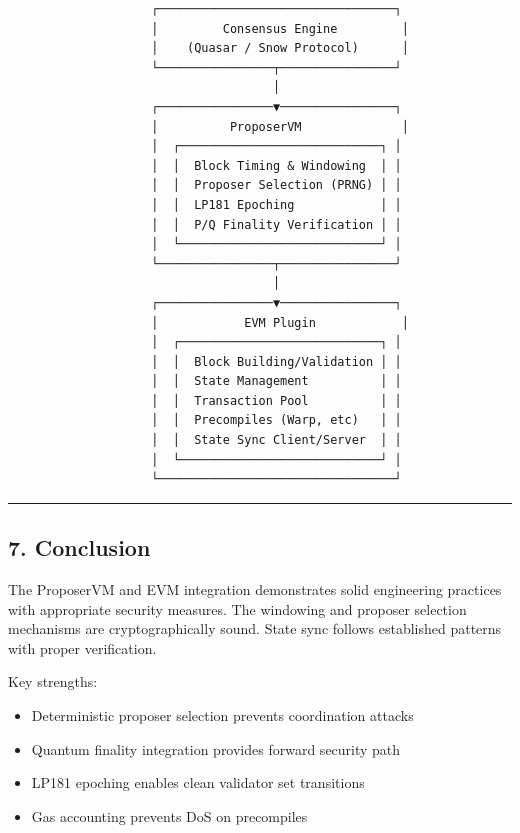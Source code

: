\documentclass[
]{article}
\providecommand{\tightlist}{%
  \setlength{\itemsep}{0pt}\setlength{\parskip}{0pt}}
\begin{document}
\begin{verbatim}
                    ┌─────────────────────────────────┐
                    │         Consensus Engine         │
                    │    (Quasar / Snow Protocol)      │
                    └────────────────┬────────────────┘
                                     │
                    ┌────────────────▼────────────────┐
                    │          ProposerVM              │
                    │  ┌────────────────────────────┐ │
                    │  │  Block Timing & Windowing  │ │
                    │  │  Proposer Selection (PRNG) │ │
                    │  │  LP181 Epoching            │ │
                    │  │  P/Q Finality Verification │ │
                    │  └────────────────────────────┘ │
                    └────────────────┬────────────────┘
                                     │
                    ┌────────────────▼────────────────┐
                    │            EVM Plugin            │
                    │  ┌────────────────────────────┐ │
                    │  │  Block Building/Validation │ │
                    │  │  State Management          │ │
                    │  │  Transaction Pool          │ │
                    │  │  Precompiles (Warp, etc)   │ │
                    │  │  State Sync Client/Server  │ │
                    │  └────────────────────────────┘ │
                    └─────────────────────────────────┘
\end{verbatim}

\begin{center}\rule{0.5\linewidth}{0.5pt}\end{center}

\subsection{7. Conclusion}\label{7-conclusion}

The ProposerVM and EVM integration demonstrates solid engineering
practices with appropriate security measures. The windowing and proposer
selection mechanisms are cryptographically sound. State sync follows
established patterns with proper verification.

Key strengths:

\begin{itemize}
\tightlist
\item
  Deterministic proposer selection prevents coordination attacks
\item
  Quantum finality integration provides forward security path
\item
  LP181 epoching enables clean validator set transitions
\item
  Gas accounting prevents DoS on precompiles
\end{itemize}
\end{document}
